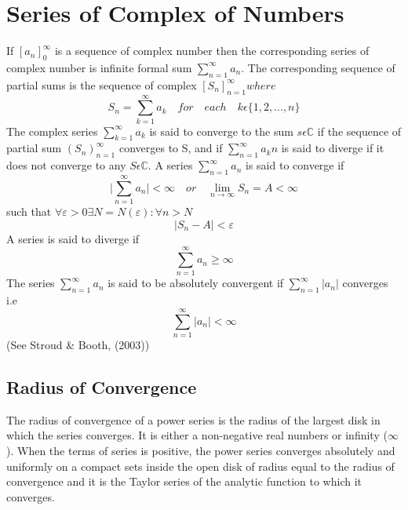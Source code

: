 \documentclass[a4paper, 12pt]{report}
\begin{document}
{\chapter{Series of Complex of Numbers}
If $[a_n]^\infty_0$ is a sequence of complex number then the corresponding series of complex number is infinite formal sum $\sum^{\infty}_{n=1}a_n$. 
The corresponding sequence of partial sums is the sequence of complex $[S_n]^\infty_{n=1} where$
\begin{equation}
S_n = \sum^{\infty}_{k=1}a_k\quad for\quad each\quad k \epsilon \{1, 2,..., n\}
\end{equation}
The complex series $\sum^{\infty}_{k=1}a_k$ is said to converge to the sum $s \epsilon \mathbb{C}$ if the sequence of partial sum $(S_n)^\infty_{n=1}$ converges to S, and if $\sum^{\infty}_{n=1}a_kn$ is said to diverge if it does not converge to any $S \epsilon \mathbb{C}$.
A series $\sum^{\infty}_{n=1}a_n$ is said to converge if
\begin{equation*}
\bigg|\sum^{\infty}_{n=1}a_n\bigg| < \infty \quad or \quad \lim_{n\rightarrow\infty}S_n = A < \infty
\end{equation*}
such that $\forall \varepsilon > 0 \exists N = N(\varepsilon): \forall n > N$
\begin{equation*}
|S_n - A| < \varepsilon
\end{equation*}
A series is said to diverge if
\begin{equation*}
\sum^{\infty}_{n=1}a_n \geq \infty
\end{equation*}
The series $\sum^{\infty}_{n=1}a_n$ is said to be absolutely convergent if $\sum^{\infty}_{n=1}|a_n|$ converges i.e 
\begin{equation*}
\sum^{\infty}_{n=1}|a_n| < \infty
\end{equation*}
(See Stroud \& Booth, (2003))
\section{Radius of Convergence}
The radius of convergence of a power series is the radius of the largest disk in which the series converges. It is either a non-negative real numbers or infinity ($\infty$). When the terms of series is positive, the power series converges absolutely and uniformly on a compact sets inside the open disk of radius equal to the radius of convergence and it is the Taylor series of the analytic function to which it converges.

}
\end{document}
